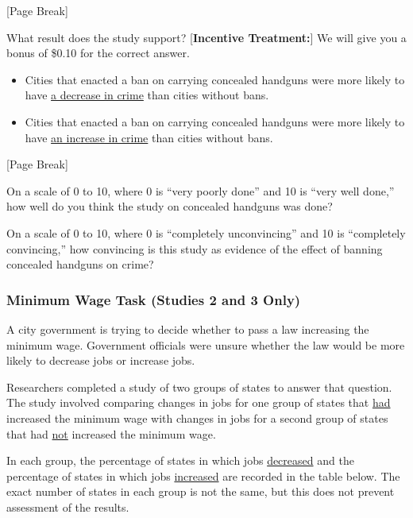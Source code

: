 \documentclass[12pt, letterpaper]{article}
\begin{document}
\vspace{-5mm}
\begin{center}
 {[}Page Break{]}
\end{center}

What result does the study support? {[}\textbf{Incentive Treatment:}{]} We will give you a bonus of \$0.10 for the correct answer.
\begin{itemize}
  \item Cities that enacted a ban on carrying concealed handguns were more likely to have \uline{a decrease in crime} than cities without bans.
  \item Cities that enacted a ban on carrying concealed handguns were more likely to have \uline{an increase in crime} than cities without bans.
\end{itemize}

\begin{center}
{[}Page Break{]}\\
\end{center}

On a scale of 0 to 10, where 0 is ``very poorly done'' and 10 is ``very well done,'' how well do you think the study on concealed handguns was done?

\bigskip
On a scale of 0 to 10, where 0 is ``completely unconvincing'' and 10 is ``completely convincing,'' how convincing is this study as evidence of the effect of banning concealed handguns on crime?

\subsubsection{Minimum Wage Task (Studies 2 and 3 Only)}
A city government is trying to decide whether to pass a law increasing the minimum wage. Government officials were unsure whether the law would be more likely to decrease jobs or increase jobs.
 
\medskip
Researchers completed a study of two groups of states to answer that question. The study involved comparing changes in jobs for one group of states that \uline{had} increased the minimum wage with changes in jobs for a second group of states that had \uline{not} increased the minimum wage.
 
\medskip
In each group, the percentage of states in which jobs \uline{decreased} and the percentage of states in which jobs \uline{increased} are recorded in the table below. The exact number of states in each group is not the same, but this does not prevent assessment of the results.
 
\end{document}
